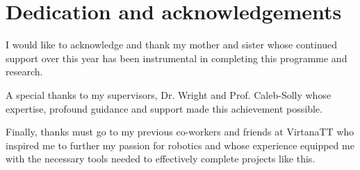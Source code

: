 %
%

\chapter*{Dedication and acknowledgements}
\begin{SingleSpace}
    I would like to acknowledge and thank my mother and sister whose continued support over this year has been instrumental in completing this programme and research.

    A special thanks to my supervisors, Dr. Wright and Prof. Caleb-Solly whose expertise, profound guidance and support made this achievement possible.

    Finally, thanks must go to my previous co-workers and friends at VirtanaTT who inspired me to further my passion for robotics and whose experience equipped me with the necessary tools needed to effectively complete projects like this.
\end{SingleSpace}
\clearpage